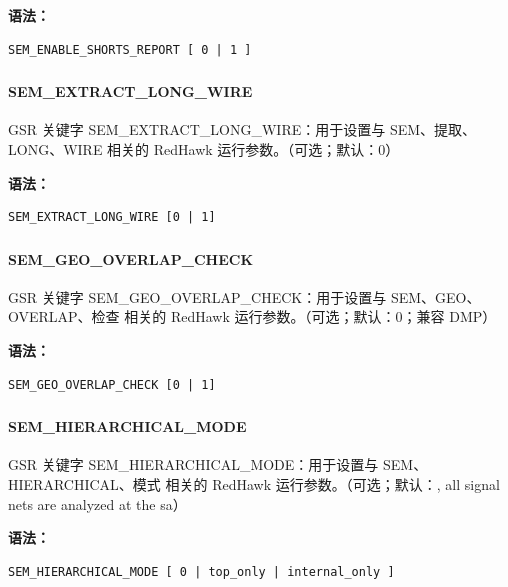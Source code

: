 \textbf{语法：}
\begin{lstlisting}
SEM_ENABLE_SHORTS_REPORT [ 0 | 1 ]
\end{lstlisting}

\subsubsection{}
\paragraph*{SEM_EXTRACT_LONG_WIRE}

GSR 关键字 SEM_EXTRACT_LONG_WIRE：用于设置与 SEM、提取、LONG、WIRE 相关的 RedHawk 运行参数。（可选；默认：0）

\textbf{语法：}
\begin{lstlisting}
SEM_EXTRACT_LONG_WIRE [0 | 1]
\end{lstlisting}

\subsubsection{}
\paragraph*{SEM_GEO_OVERLAP_CHECK}

GSR 关键字 SEM_GEO_OVERLAP_CHECK：用于设置与 SEM、GEO、OVERLAP、检查 相关的 RedHawk 运行参数。（可选；默认：0；兼容 DMP）

\textbf{语法：}
\begin{lstlisting}
SEM_GEO_OVERLAP_CHECK [0 | 1]
\end{lstlisting}

\subsubsection{}
\paragraph*{SEM_HIERARCHICAL_MODE}

GSR 关键字 SEM_HIERARCHICAL_MODE：用于设置与 SEM、HIERARCHICAL、模式 相关的 RedHawk 运行参数。（可选；默认：, all signal nets are analyzed at the sa）

\textbf{语法：}
\begin{lstlisting}
SEM_HIERARCHICAL_MODE [ 0 | top_only | internal_only ]
\end{lstlisting}


